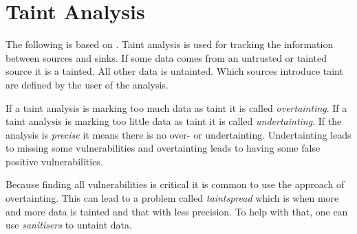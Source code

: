 \section{Taint Analysis}
The following is based on \citet[Part 3]{schwartz2010all}.
Taint analysis is used for tracking the information between sources and sinks.
If some data comes from an untrusted or tainted source it is a tainted.
All other data is untainted.
Which sources introduce taint are defined by the user of the analysis.

If a taint analysis is marking too much data as taint it is called \textit{overtainting}.
If a taint analysis is marking too little data as taint it is called \textit{undertainting}.
If the analysis is \textit{precise} it means there is no over- or undertainting.
Undertainting leads to missing some vulnerabilities and overtainting leads to having some false positive vulnerabilities.

Because finding all vulnerabilities is critical it is common to use the approach of overtainting.
This can lead to a problem called \textit{taintspread} which is when more and more data is tainted and that with less precision.
To help with that, one can use \textit{sanitisers} to untaint data.

